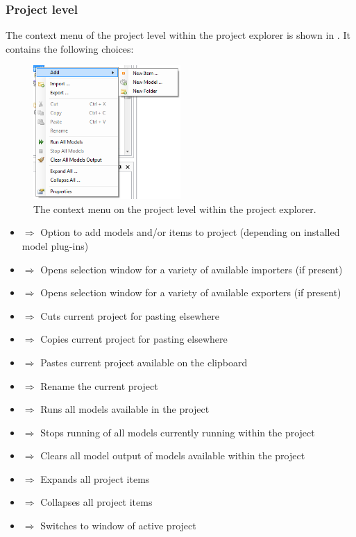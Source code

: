 \subsubsection{Project level}
\label{subsubsec:projectlevel}
The context menu of the project level within the project explorer is shown in . It contains the following choices:
%
\begin{figure} [H]
	\centering
		\includegraphics[width=0.5\textwidth]{Figures/Chapter_overview/context_menu_project.png}
	\caption{The context menu on the project level within the project explorer.}
	\label{fig:contextmenuproject}
\end{figure}
\begin{itemize}
	\item {} $\Rightarrow$ Option to add models and/or items to project (depending on installed model plug-ins)
	\item {} $\Rightarrow$ Opens selection window for a variety of available importers (if present)
	\item {} $\Rightarrow$ Opens selection window for a variety of available exporters (if present) 
	\item {} $\Rightarrow$ Cuts current project for pasting elsewhere
	\item {} $\Rightarrow$ Copies current project for pasting elsewhere
	\item {} $\Rightarrow$ Pastes current project available on the clipboard
	\item {} $\Rightarrow$ Rename the current project
	\item {} $\Rightarrow$ Runs all models available in the project
	\item {} $\Rightarrow$ Stops running of all models currently running within the project
	\item {} $\Rightarrow$ Clears all model output of models available within the project
	\item {} $\Rightarrow$ Expands all project items
	\item {} $\Rightarrow$ Collapses all project items
	\item {} $\Rightarrow$ Switches to  window of active project
\end{itemize}
